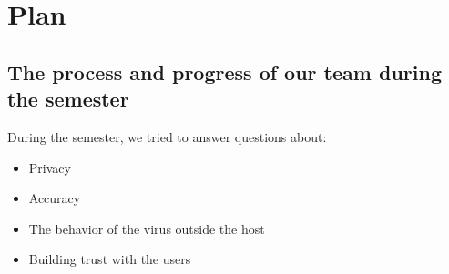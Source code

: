 \section{Plan}
  \subsection{The  process  and  progress  of  our  team  during  the semester}
    \par During the semester, we tried to answer questions about:
      \begin{itemize}
        \item Privacy
        \item Accuracy
        \item The behavior of the virus outside the host
        \item Building trust with the users
      \end{itemize}
    

